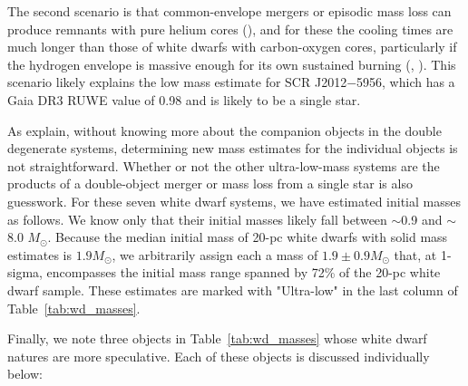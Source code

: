 \documentclass[twocolumn,tighten,twocolappendix]{aastex631}
\begin{document}
The second scenario is that common-envelope mergers or episodic mass loss can produce remnants with pure helium cores (\citealt{serenelli2001}), and for these the cooling times are much longer than those of white dwarfs with carbon-oxygen cores, particularly if the hydrogen envelope is massive enough for its own sustained burning (\citealt{alberts1996}, \citealt{sarna1999}). This scenario likely explains the low mass estimate for SCR J2012$-$5956, which has a Gaia DR3 RUWE value of 0.98 and is likely to be a single star.

As \cite{giammichele2012} explain, without knowing more about the companion objects in the double degenerate systems, determining new mass estimates for the individual objects is not straightforward. Whether or not the other ultra-low-mass systems are the products of a double-object merger or mass loss from a single star is also guesswork. For these seven white dwarf systems, we have estimated initial masses as follows. We know only that their initial masses likely fall between $\sim$0.9 and $\sim$8.0 $M_\odot$. Because the median initial mass of 20-pc white dwarfs with solid mass estimates is $1.9 M_\odot$, we arbitrarily assign each a mass of $1.9{\pm}0.9 M_\odot$ that, at 1-sigma, encompasses the initial mass range spanned by 72\% of the 20-pc white dwarf sample. These estimates are marked with "Ultra-low" in the last column of Table~\ref{tab:wd_masses}.

Finally, we note three objects in Table~\ref{tab:wd_masses} whose white dwarf natures are more speculative. Each of these objects is discussed individually below:
\end{document}
